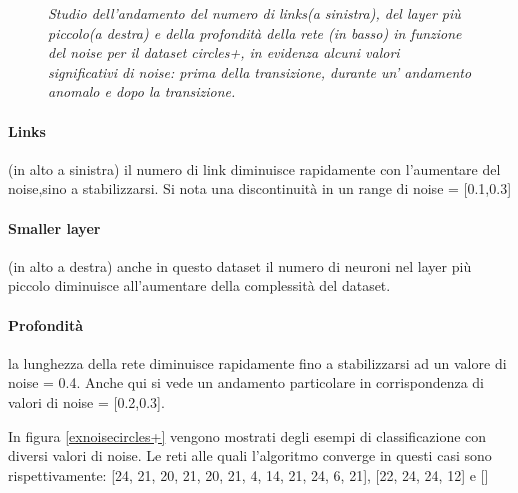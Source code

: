 \documentclass[12pt,a4paper]{report}
\begin{document}
\begin{figure}[H]
 \caption{\textit{Studio dell'andamento del numero di links(a sinistra), del layer più piccolo(a destra) e della profondità della rete (in basso) in funzione del noise per il dataset circles+, in evidenza alcuni valori significativi di noise: prima della transizione, durante un' andamento anomalo e dopo la transizione.}}
 \label{noisecircles+}
\end{figure}

\paragraph{Links} (in alto a sinistra) il numero di link diminuisce rapidamente con l'aumentare del noise,sino a stabilizzarsi. 
Si nota una discontinuità in un range di noise = [0.1,0.3] 

\paragraph{Smaller layer} (in alto a destra) anche in questo dataset il numero di neuroni nel layer più piccolo diminuisce all'aumentare della complessità del dataset.

\paragraph{Profondità} la lunghezza della rete diminuisce rapidamente fino a stabilizzarsi ad un valore di noise = 0.4.
Anche qui si vede un andamento particolare in corrispondenza di valori di noise = [0.2,0.3].

In figura \ref{exnoisecircles+} vengono mostrati degli esempi di classificazione con diversi valori di noise.
Le reti alle quali l'algoritmo converge in questi casi sono rispettivamente: [24, 21, 20, 21, 20, 21, 4, 14, 21, 24, 6, 21], [22, 24, 24, 12] e []
\end{document}
